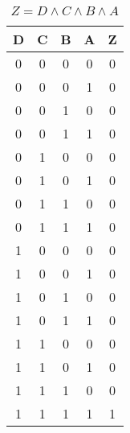 \begin{center}
    \begin{table}[h] \caption{\(Z = D \land C \land B \land A \)}
        \begin{center}
            \begin{tabular}{|c|c|c|c||c|} \hline
            D & C & B & A & Z \\ \hline\hline
            0 & 0 & 0 & 0 & 0 \\ \hline
            0 & 0 & 0 & 1 & 0 \\ \hline
            0 & 0 & 1 & 0 & 0 \\ \hline
            0 & 0 & 1 & 1 & 0 \\ \hline
            0 & 1 & 0 & 0 & 0 \\ \hline
            0 & 1 & 0 & 1 & 0 \\ \hline
            0 & 1 & 1 & 0 & 0 \\ \hline
            0 & 1 & 1 & 1 & 0 \\ \hline
            1 & 0 & 0 & 0 & 0 \\ \hline
            1 & 0 & 0 & 1 & 0 \\ \hline
            1 & 0 & 1 & 0 & 0 \\ \hline
            1 & 0 & 1 & 1 & 0 \\ \hline
            1 & 1 & 0 & 0 & 0 \\ \hline
            1 & 1 & 0 & 1 & 0 \\ \hline
            1 & 1 & 1 & 0 & 0 \\ \hline
            1 & 1 & 1 & 1 & 1 \\ \hline
            \end{tabular}
        \end{center}
    \end{table}
\end{center}
